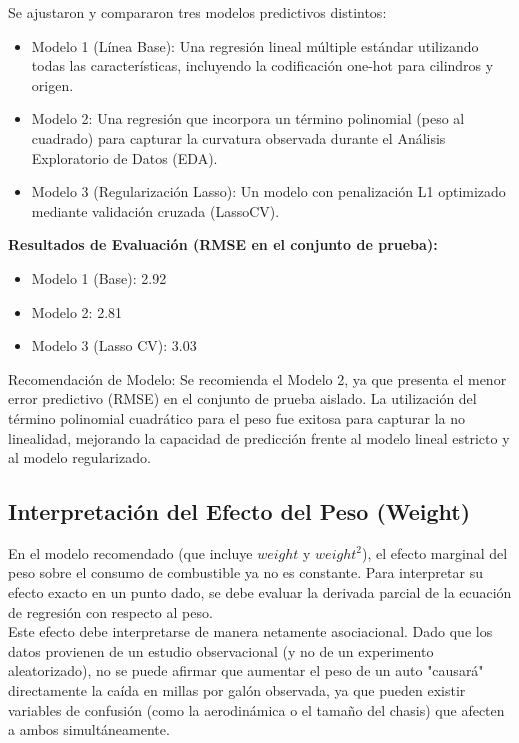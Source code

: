 \documentclass[11pt,spanish]{article}
\begin{document}
Se ajustaron y compararon tres modelos predictivos distintos:
\begin{itemize}
    \item Modelo 1 (Línea Base): Una regresión lineal múltiple estándar utilizando todas las características, incluyendo la codificación one-hot para cilindros y origen.
\end{itemize}
\begin{itemize}
    \item Modelo 2: Una regresión que incorpora un término polinomial (peso al cuadrado) para capturar la curvatura observada durante el Análisis Exploratorio de Datos (EDA).
\end{itemize}
\begin{itemize}
    \item Modelo 3 (Regularización Lasso): Un modelo con penalización L1 optimizado mediante validación cruzada (LassoCV).
\end{itemize}
\textbf{Resultados de Evaluación (RMSE en el conjunto de prueba):}
\begin{itemize}
    \item Modelo 1 (Base): 2.92
\end{itemize}
\begin{itemize}
    \item Modelo 2: 2.81
\end{itemize}
\begin{itemize}
    \item Modelo 3 (Lasso CV): 3.03
\end{itemize}
Recomendación de Modelo: Se recomienda el Modelo 2, ya que presenta el menor error predictivo (RMSE) en el conjunto de prueba aislado. La utilización del término polinomial cuadrático para el peso fue exitosa para capturar la no linealidad, mejorando la capacidad de predicción frente al modelo lineal estricto y al modelo regularizado.

\subsection{Interpretación del Efecto del Peso (Weight)}

En el modelo recomendado (que incluye $weight$ y $weight^2$), el efecto marginal del peso sobre el consumo de combustible ya no es constante. Para interpretar su efecto exacto en un punto dado, se debe evaluar la derivada parcial de la ecuación de regresión con respecto al peso.\\

Este efecto debe interpretarse de manera netamente asociacional. Dado que los datos provienen de un estudio observacional (y no de un experimento aleatorizado), no se puede afirmar que aumentar el peso de un auto "causará" directamente la caída en millas por galón observada, ya que pueden existir variables de confusión (como la aerodinámica o el tamaño del chasis) que afecten a ambos simultáneamente.
\end{document}
